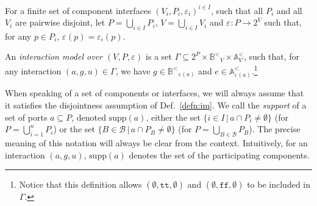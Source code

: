 \documentclass{llncs}
\newcommand{\Simon}{\\\hfill\mdash Simon}
\newcommand{\noteSB}[2][color=green!40, size=\tiny]{\todo[#1]{{#2}\Simon}}
\newcommand{\Ludo}{\\\hfill\mdash Ludo}
\newcommand{\noteLH}[2][color=orange!40, size=\tiny]{\todo[#1]{{#2}\Ludo}}
\newcommand{\defn}[1]{Def.~\ref{defn:#1}}
\newcommand{\sA}{\ensuremath{\mathbb{A}}}
\newcommand{\cB}{\ensuremath{\mathcal{B}}}
\newcommand{\sB}{\ensuremath{\mathbb{B}}}
\newcommand{\mdash}[1][]{---#1}
\newcommand{\ie}[1][\ ]{i.e.#1}
\newcommand{\bydef}[1]{\ensuremath{\stackrel{\mathit{\scriptscriptstyle def}}{#1}}}
\newcommand{\setdef}[2]{\ensuremath{\{{#1}\,|\,{#2}\}}}
\newcommand{\true} {\ensuremath{\mathtt{t\!t}}}
\newcommand{\false}{\ensuremath{\mathtt{f\!f}}}
\newcommand{\noop} {\ensuremath{\emptyset}} %
\newcommand{\order}{<}
\newcommand{\ordbool}{\ensuremath{\sB^{\order}}}
\newcommand{\guards}[1]{\ensuremath{\ordbool_{#1}}}
\newcommand{\updates}[1]{\ensuremath{\sA^{\order}_{#1}}}
\newcommand{\export}[1][]{\ensuremath{\varepsilon_{#1}}}
\newcommand{\supp}[1]{\ensuremath{\mathrm{supp}(#1)}}
\begin{document}
\begin{definition}
  \label{defn:im}
  For a finite set of component interfaces $(V_i, P_i,
  \export[i])^{i \in I}$, such that all $P_i$ and all $V_i$ are
  pairwise disjoint, %
  let $P = \bigcup_{i \in I} P_i$, $V = \bigcup_{i
    \in I} V_i$ and $\export : P \rightarrow 2^V$ such that, for any
  $p \in P_i$, $\export(p) = \export[i](p)$. 
%

  An \emph{interaction model over $(V, P, \export)$} is a set $\Gamma
  \subseteq 2^P \times \guards{V} \times \updates{V}$, such that,
  for any interaction $(a, g, u) \in \Gamma$, we have
  $g \in \guards{\export(a)}$ and $e \in \updates{\export(a)}$.\footnote{%
%
    Notice that this definition allows $(\emptyset, \true,
    \noop)$ and $(\emptyset, \false, \noop)$ to be included in
    $\Gamma$.
%
  }
\end{definition}

When speaking of a set of components or interfaces, we will always
assume that it satisfies the disjointness assumption of \defn{im}.
%
We call the \emph{support} of a set of ports $a \subseteq P$, denoted
$\supp{a}$, either the set $\setdef{i \in I}{a \cap P_i \neq
  \emptyset}$ (for $P = \bigcup_{i=1}^n P_i$) or the set $\setdef{B
  \in \cB}{a \cap P_B \neq \emptyset}$ (for $P = \bigcup_{B \in \cB}
P_B$).  The precise meaning of this notation will always be clear from
the context.  Intuitively, for an interaction $(a, g, u)$, $\supp{a}$
denotes the set of the participating components.
\end{document}
